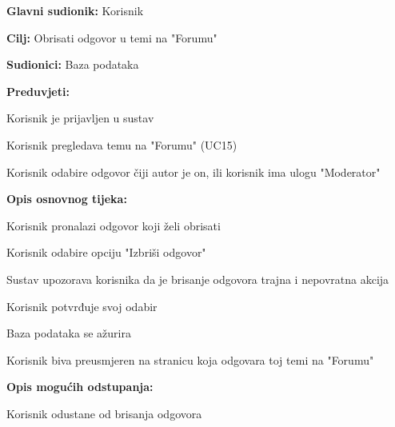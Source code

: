 					\noindent {}
					\begin{packed_item}
	
						\item \textbf{Glavni sudionik: }Korisnik
						\item  \textbf{Cilj:} Obrisati odgovor u temi na "Forumu"
						\item  \textbf{Sudionici:} Baza podataka
						\item  \textbf{Preduvjeti:}
						\item[] \begin{packed_enum}
							\item Korisnik je prijavljen u sustav
							\item Korisnik pregledava temu na "Forumu" (UC15)
							\item Korisnik odabire odgovor čiji autor je on, ili korisnik ima ulogu "Moderator"
						\end{packed_enum}
						\item  \textbf{Opis osnovnog tijeka:}
						
						\item[] \begin{packed_enum}
	
							\item Korisnik pronalazi odgovor koji želi obrisati
							\item Korisnik odabire opciju "Izbriši odgovor"
							\item Sustav upozorava korisnika da je brisanje odgovora trajna i nepovratna akcija
							\item Korisnik potvrđuje svoj odabir
							\item Baza podataka se ažurira
							\item Korisnik biva preusmjeren na stranicu koja odgovara toj temi na "Forumu"
							
							
						\end{packed_enum}
						
						\item  \textbf{Opis mogućih odstupanja:}
						
						\item[] \begin{packed_item}
						\item[4.a] Korisnik odustane od brisanja odgovora
							\item[] \begin{packed_enum}
								

\end{packed_enum}
\end{packed_item}
\end{packed_item}
